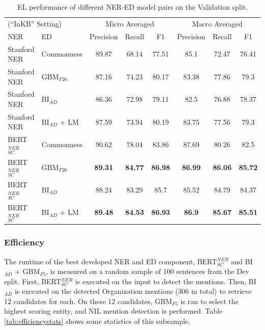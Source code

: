 \documentclass{report}
\theoremstyle{definition}
\theoremstyle{remark}
\begin{document}
\begin{table}[H]
    \vspace{0.5cm}\begin{tabular}{l l c c c| c c c}
    \multicolumn{2}{l}{(``InKB'' Setting)}&\multicolumn{3}{c|}{Micro Averaged}&\multicolumn{3}{c}{Macro Averaged} \\
    NER & ED &Precision&Recall&F1&Precision&Recall&F1\\
    \hline
    Stanford NER& Commonness & 89.87	&68.14&	77.51&	85.1	&72.47&	76.41\\
    Stanford NER& GBM$_{F26}$ & 87.16	&74.23&	80.17	&83.38	&77.86&	79.3\\
    Stanford NER & BI$_{AD}$ &86.36	&72.98&	79.11&	82.5	&76.88&	78.37\\
    Stanford NER &BI$_{AD}$ + LM &87.59&73.94&80.19&83.75&77.56&79.3\\ 
    BERT$_{SC}^{NER}$ & Commonness & 90.62	&78.04&	83.86	&87.69	&80.26&	82.5\\
    BERT$_{SC}^{NER}$ & GBM$_{F26}$ & \textbf{89.31}	&\textbf{84.77}&	\textbf{86.98}	&\textbf{86.99}	&\textbf{86.06}&	\textbf{85.72}\\
    BERT$_{SC}^{NER}$ & BI$_{AD}$ &88.24	&83.29&	85.7	&85.52	&84.79&	84.37\\
    BERT$_{SC}^{NER}$ & BI$_{AD}$ + LM &\textbf{89.48}&\textbf{84.53}&\textbf{86.93}&\textbf{86.9}&\textbf{85.67}&\textbf{85.51}\\
    \end{tabular}
    \caption{EL performance of different NER-ED model pairs on the Validation split. }
    \label{tab:elresultsvalid}
\end{table}


\subsubsection{Efficiency}
The runtime of the best developed NER and ED component, BERT$_{SC}^{NER}$ and  BI$_{AD}$ + GBM$_{F5}$, is measured on a random sample of 100 sentences from the Dev split. First, BERT$_{SC}^{NER}$ is executed on the input to detect the mentions. Then, BI$_{AD}$ is executed on the detected Organization mentions (306 in total) to retrieve 12 candidates for each. On these 12 candidates, GBM$_{F5}$ is ran to select the highest scoring entity, and NIL mention detection is performed. Table \ref{tab:efficiencystats} shows some statistics of this subsample. 
\end{document}
